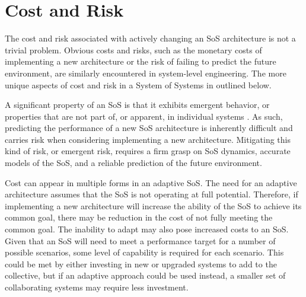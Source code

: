 \section{Cost and Risk}

The cost and risk associated with actively changing an SoS architecture is not a trivial problem. Obvious costs and risks, such as the monetary costs of implementing a new architecture or the risk of failing to predict the future environment, are similarly encountered in system-level engineering. The more unique aspects of cost and risk in a System of Systems in outlined below.

A significant property of an SoS is that it exhibits emergent behavior, or properties that are not part of, or apparent, in individual systems \cite{Sage2001,DeLaurentis2005}. As such, predicting the performance of a new SoS architecture is inherently difficult and carries risk when considering implementing a new architecture. Mitigating this kind of risk, or emergent risk, requires a firm grasp on SoS dynamics, accurate models of the SoS, and a reliable prediction of the future environment.

Cost can appear in multiple forms in an adaptive SoS. The need for an adaptive architecture assumes that the SoS is not operating at full potential. Therefore, if implementing a new architecture will increase the ability of the SoS to achieve its common goal, there may be reduction in the cost of not fully meeting the common goal. The inability to adapt may also pose increased costs to an SoS. Given that an SoS will need to meet a performance target for a number of possible scenarios, some level of capability is required for each scenario. This could be met by either investing in new or upgraded systems to add to the collective, but if an adaptive approach could be used instead, a smaller set of collaborating systems may require less investment.